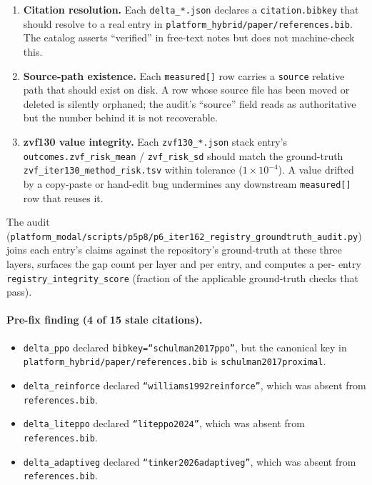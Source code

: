\begin{enumerate}
\item \textbf{Citation resolution.} Each \texttt{delta\_*.json} declares a
\texttt{citation.bibkey} that should resolve to a real entry in
\texttt{platform_hybrid/paper/references.bib}. The catalog asserts ``verified'' in
free-text notes but does not machine-check this.
\item \textbf{Source-path existence.} Each \texttt{measured[]} row carries
a \texttt{source} relative path that should exist on disk. A row whose
source file has been moved or deleted is silently orphaned; the audit's
``source'' field reads as authoritative but the number behind it is not
recoverable.
\item \textbf{zvf130 value integrity.} Each \texttt{zvf130\_*.json} stack
entry's \texttt{outcomes.zvf\_risk\_mean} / \texttt{zvf\_risk\_sd} should
match the ground-truth \texttt{zvf\_iter130\_method\_risk.tsv} within
tolerance ($1\!\times\!10^{-4}$). A value drifted by a copy-paste or
hand-edit bug undermines any downstream \texttt{measured[]} row that
reuses it.
\end{enumerate}

The audit (\texttt{platform_modal/scripts/p5p8/p6\_iter162\_registry\_groundtruth\_audit.py})
joins each entry's claims against the repository's ground-truth at these three
layers, surfaces the gap count per layer and per entry, and computes a per-
entry \texttt{registry\_integrity\_score} (fraction of the applicable
ground-truth checks that pass).

\paragraph{Pre-fix finding (4 of 15 stale citations).}
\begin{itemize}
\item \texttt{delta\_ppo} declared \texttt{bibkey=``schulman2017ppo''}, but
the canonical key in \texttt{platform_hybrid/paper/references.bib} is
\texttt{schulman2017proximal}.
\item \texttt{delta\_reinforce} declared \texttt{``williams1992reinforce''},
which was absent from \texttt{references.bib}.
\item \texttt{delta\_liteppo} declared \texttt{``liteppo2024''}, which was
absent from \texttt{references.bib}.
\item \texttt{delta\_adaptiveg} declared \texttt{``tinker2026adaptiveg''},
which was absent from \texttt{references.bib}.
\end{itemize}

